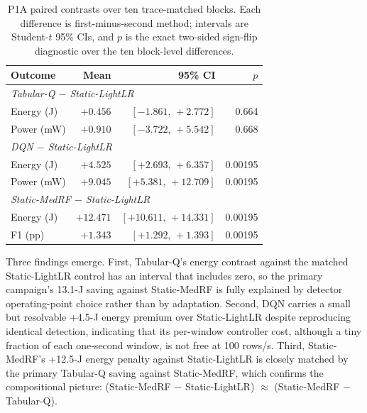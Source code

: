 \begin{table}[t]
\centering\footnotesize
\caption{P1A paired contrasts over ten trace-matched blocks. Each difference is first-minus-second method; intervals are Student-$t$ 95\% CIs, and $p$ is the exact two-sided sign-flip diagnostic over the ten block-level differences.}
\label{tab:p1a}
\setlength{\tabcolsep}{2.6pt}
\begin{tabular}{@{}lrrr@{}}\toprule
Outcome & Mean & 95\% CI & $p$\\\midrule
\multicolumn{4}{l}{\emph{Tabular-Q $-$ Static-LightLR}}\\
\hspace{0.4em}Energy (J)  & $+0.456$  & $[-1.861,\,+2.772]$   & 0.664\\
\hspace{0.4em}Power (mW)  & $+0.910$  & $[-3.722,\,+5.542]$   & 0.668\\
\multicolumn{4}{l}{\emph{DQN $-$ Static-LightLR}}\\
\hspace{0.4em}Energy (J)  & $+4.525$  & $[+2.693,\,+6.357]$   & 0.00195\\
\hspace{0.4em}Power (mW)  & $+9.045$  & $[+5.381,\,+12.709]$  & 0.00195\\
\multicolumn{4}{l}{\emph{Static-MedRF $-$ Static-LightLR}}\\
\hspace{0.4em}Energy (J)  & $+12.471$ & $[+10.611,\,+14.331]$ & 0.00195\\
\hspace{0.4em}F1 (pp)     & $+1.343$  & $[+1.292,\,+1.393]$   & 0.00195\\
\bottomrule\end{tabular}
\end{table}

Three findings emerge. First, Tabular-Q's energy contrast against the matched Static-LightLR control has an interval that includes zero, so the primary campaign's 13.1-J saving against Static-MedRF is fully explained by detector operating-point choice rather than by adaptation. Second, DQN carries a small but resolvable +4.5-J energy premium over Static-LightLR despite reproducing identical detection, indicating that its per-window controller cost, although a tiny fraction of each one-second window, is not free at 100 rows/s. Third, Static-MedRF's +12.5-J energy penalty against Static-LightLR is closely matched by the primary Tabular-Q saving against Static-MedRF, which confirms the compositional picture: (Static-MedRF $-$ Static-LightLR) $\approx$ (Static-MedRF $-$ Tabular-Q).

